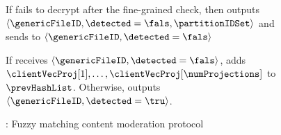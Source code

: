 \begin{figure}
{\begin{minipage}[t]{\textwidth}
\item If \server fails to decrypt after the fine-grained check, then \server outputs $\langle \genericFileID, \detected = \fals, \partitionIDSet \rangle$ and sends to \client $\langle \genericFileID, \detected=\fals\rangle$



\item If \client receives $\langle \genericFileID, \detected=\fals\rangle$, \client adds $\clientVecProj[1], \dots, \clientVecProj[\numProjections]$ to $\prevHashList$. Otherwise, \client outputs $\langle \genericFileID, \detected=\tru \rangle$.


%
%
%


\enumListEnd


\end{minipage}
}
\caption{\protocolFM: Fuzzy matching content moderation protocol\label{fig:fuzzy_match}}
 \end{figure}


